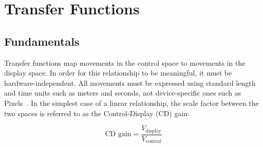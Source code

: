 \documentclass[12pt,a4paper]{report}
\begin{document}
        \section{Transfer Functions}

        \subsection{Fundamentals}

        Transfer functions map movements in the control space to movements in the display space. In order for this relationship to be meaningful, it must be hardware-independent. All movements must be expressed using standard length and time units such as meters and seconds, not device-specific ones such as Pixels~\cite{casiez2011no}. In the simplest case of a linear relationship, the scale factor between the two spaces is referred to as the Control-Display (CD) gain:

        \begin{equation}
            \text{CD gain} = \frac{V_{\text{display}}}{V_{\text{control}}}
        \end{equation}
\end{document}
